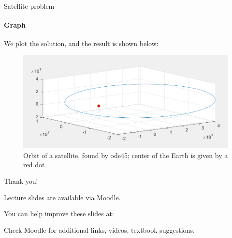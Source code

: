 \documentclass{beamer}
\begin{document}
\begin{frame}{Satellite problem}
	\framesubtitle{Graph}
	\begin{flushleft}
		
		We plot the solution, and the result is shown below:
		
		\begin{figure}
			\centering
			\includegraphics[width=0.9\linewidth]{Satellite}
			\caption{Orbit of a satellite, found by ode45; center of the Earth is given by a red dot}
			\label{fig:satellite}
		\end{figure}
		
		
	\end{flushleft}
\end{frame}




\begin{frame}{Thank you!}
\centerline{Lecture slides are available via Moodle.}
\bigskip
\centerline{You can help improve these slides at:}
\centerline{\mygit}
\bigskip
\centerline{Check Moodle for additional links, videos, textbook suggestions.}
\bigskip

\centerline{\textcolor{black}{}}

\end{frame}
\end{document}
